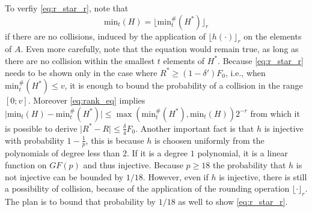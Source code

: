 \documentclass[11pt,a4paper]{article}
\newcommand{\size}[1]{\lvert#1\rvert}
\begin{document}
To verfiy \autoref{eq:r_star_r}, note that
\begin{equation}
    \label{eq:rank_eq}
    \mathrm{min}_t(H) = \lfloor \mathrm{min}_t^{\#}(H^*) \rfloor_r
\end{equation}
if there are no collisions, induced by the application of $\lfloor h(\cdot) \rfloor_r$ on the elements of $A$.
Even more carefully, note that the equation would remain true, as long as there are no collision within the smallest $t$ elements of $H^*$.
Because \autoref{eq:r_star_r} needs to be shown only in the case where $R^* \geq (1-\delta') F_0$, i.e., when $\mathrm{min}_t^{\#}(H^*) \leq v$,
it is enough to bound the probability of a collision in the range $[0; v]$.
Moreover \autoref{eq:rank_eq} implies $\size{\mathrm{min}_t(H) - \mathrm{min}_t^{\#}(H^*)} \leq \max(\mathrm{min}_t^{\#}(H^*), \mathrm{min}_t(H)) 2^{-r}$ from
which it is possible to derive $\size{R^*-R} \leq \frac{\delta}{4} F_0$.
%
Another important fact is that $h$ is injective with probability $1-\frac{1}{p}$, this is because $h$ is choosen uniformly from the polynomials of degree less than $2$.
If it is a degree $1$ polynomial, it is a linear function on $GF(p)$ and thus injective.
Because $p \geq 18$ the probability that $h$ is not injective can be bounded by $1/18$.
However, even if $h$ is injective, there is still a possibility of collision, because of the application of the rounding operation $\lfloor \cdot \rfloor_r$.
The plan is to bound that probability by $1/18$ as well to show \autoref{eq:r_star_r}.
\end{document}
